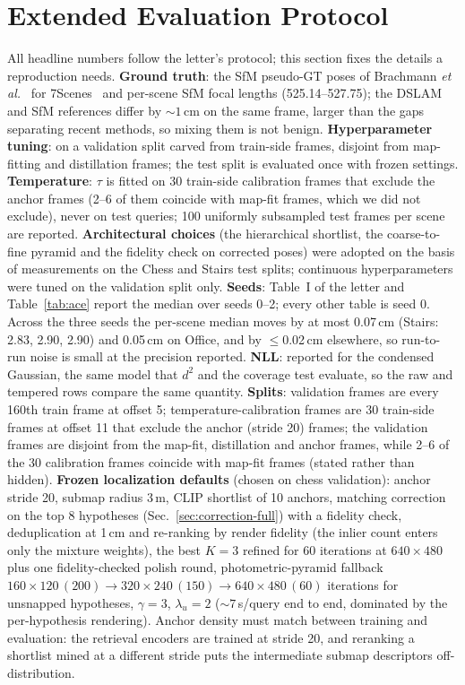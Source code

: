 \documentclass[journal]{IEEEtran}
\begin{document}
\section{Extended Evaluation Protocol}
\label{sec:protocol}
All headline numbers follow the letter's protocol; this section fixes the
details a reproduction needs. \textbf{Ground truth}: the SfM
pseudo-GT poses of Brachmann \emph{et al.}~\cite{brachmann2021dslam} for 7Scenes~\cite{sevenscenes_b} and per-scene SfM focal lengths (525.14--527.75); the DSLAM
and SfM references differ by ${\sim}1$\,cm on the same frame, larger than the
gaps separating recent methods, so mixing them is not benign.
\textbf{Hyperparameter tuning}: on a validation split carved from train-side
frames, disjoint from map-fitting and distillation frames; the test split is
evaluated once with frozen settings. \textbf{Temperature}: $\tau$ is fitted on 30 train-side calibration frames that exclude the anchor frames (2--6 of them coincide with map-fit frames, which we did not exclude), never on test queries; 100 uniformly subsampled test frames per scene are reported. \textbf{Architectural choices} (the hierarchical shortlist, the coarse-to-fine pyramid and the fidelity check on corrected poses) were adopted on the basis of measurements on the Chess and Stairs test splits; continuous hyperparameters were tuned on the validation split only. \textbf{Seeds}: Table~I of the letter and Table~\ref{tab:ace} report the median over seeds 0--2; every other table is seed 0. Across the three seeds the per-scene median moves by at most 0.07\,cm (Stairs: 2.83, 2.90, 2.90) and 0.05\,cm on Office, and by $\le$0.02\,cm elsewhere, so run-to-run noise is small at the precision reported.
\textbf{NLL}: reported for the condensed Gaussian, the same model that
$d^2$ and the coverage test evaluate, so the raw and tempered rows compare
the same quantity.
\textbf{Splits}: validation frames are every 160th train frame at offset 5;
temperature-calibration frames are 30 train-side frames at offset 11 that exclude the anchor (stride 20) frames; the validation frames are disjoint from the map-fit, distillation and anchor frames, while 2--6 of the 30 calibration frames coincide with map-fit frames (stated rather than hidden).
\textbf{Frozen localization defaults} (chosen on chess validation):
anchor stride 20, submap radius 3\,m, CLIP shortlist of 10 anchors, matching
correction on the top 8 hypotheses (Sec.~\ref{sec:correction-full}) with a fidelity check, deduplication at 1\,cm and re-ranking by render fidelity (the inlier count enters only the mixture weights), the best $K{=}3$ refined for 60 iterations at $640{\times}480$ plus one fidelity-checked polish round, photometric-pyramid fallback $160{\times}120\,(200) \to 320{\times}240\,(150) \to 640{\times}480\,(60)$ iterations for unsnapped hypotheses, $\gamma{=}3$, $\lambda_u{=}2$
(${\sim}7$\,s/query end to end, dominated by the per-hypothesis rendering). Anchor density must match between
training and evaluation: the retrieval encoders are trained at stride 20, and
reranking a shortlist mined at a different stride puts the intermediate
submap descriptors off-distribution.
\end{document}
